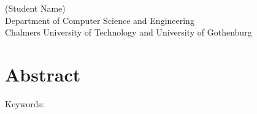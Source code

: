 (Student Name)\\
Department of Computer Science and Engineering\\
Chalmers University of Technology and University of Gothenburg\setlength{\parskip}{0.5cm}

\thispagestyle{plain}			%
\setlength{\parskip}{0pt plus 1.0pt}
\section*{Abstract}


\vfill
Keywords: 

\newpage				%
\thispagestyle{empty}
\mbox{}
